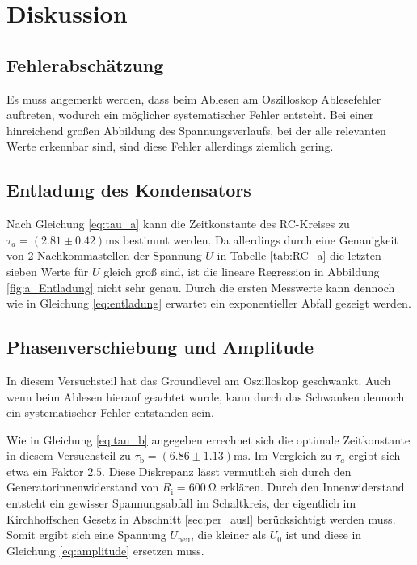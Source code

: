 \section{Diskussion}

\subsection{Fehlerabschätzung}
Es muss angemerkt werden, dass beim Ablesen am Oszilloskop Ablesefehler auftreten, wodurch ein möglicher systematischer Fehler entsteht.
Bei einer hinreichend großen Abbildung des Spannungsverlaufs, bei der alle relevanten Werte erkennbar sind,
sind diese Fehler allerdings ziemlich gering.

\subsection{Entladung des Kondensators}
Nach Gleichung \eqref{eq:tau_a} kann die Zeitkonstante des RC-Kreises zu $\tau_a = (\num{2.81} \pm \num{0.42}) \unit{\milli\second}$
bestimmt werden.
Da allerdings durch eine Genauigkeit von 2 Nachkommastellen der Spannung $U$ in Tabelle \ref{tab:RC_a} die letzten sieben Werte für $U$
gleich groß sind, ist die lineare Regression in Abbildung \ref{fig:a_Entladung} nicht sehr genau.
Durch die ersten Messwerte kann dennoch wie in Gleichung \eqref{eq:entladung} erwartet ein exponentieller Abfall gezeigt werden.



\subsection{Phasenverschiebung und Amplitude}
In diesem Versuchsteil hat das Groundlevel am Oszilloskop geschwankt.
Auch wenn beim Ablesen hierauf geachtet wurde, kann durch das Schwanken dennoch ein systematischer Fehler entstanden sein.

\noindent
Wie in Gleichung \eqref{eq:tau_b} angegeben errechnet sich die optimale Zeitkonstante in diesem Versuchsteil zu 
$\tau_\text{b} = (\num{6.86}\pm \num{1.13})\unit{\milli\s}$.
Im Vergleich zu $\tau_a$ ergibt sich etwa ein Faktor $\num{2.5}$.
Diese Diskrepanz lässt vermutlich sich durch den Generatorinnenwiderstand von $R_\text{i} = \qty[]{600}{\ohm}$ erklären.
Durch den Innenwiderstand entsteht ein gewisser Spannungsabfall im Schaltkreis, der eigentlich im Kirchhoffschen Gesetz in Abschnitt
\ref{sec:per_ausl} berücksichtigt werden muss. 
Somit ergibt sich eine Spannung $U_\text{neu}$, die kleiner als $U_0$ ist und diese in Gleichung \eqref{eq:amplitude} ersetzen muss.

